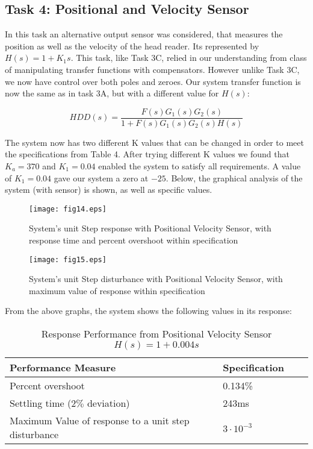 \documentclass{article}
\newcommand{\matlab}[1]{%
%
}
\begin{document}
\subsection*{Task 4: Positional and Velocity Sensor}

In this task an alternative output sensor was considered, that measures the
position as well as the velocity of the head reader. Its represented by $H(s)
= 1 + K_1s$. This task, like Task 3C, relied in our understanding from class of
manipulating transfer functions with compensators. However unlike Task 3C, we
now have control over both poles and zeroes. Our system transfer function is
now the same as in task 3A, but with a different value for $H(s)$:

$$HDD(s) = \frac{F(s)G_1(s)G_2(s)}{1 + F(s)G_1(s)G_2(s)H(s)}$$

The system now has two different K values that can be changed in order to meet
the specifications from Table 4. After trying different K values we found that
$K_a = 370$ and $K_1 = 0.04$ enabled the system to satisfy all requirements.
A value of $K_1 = 0.04$ gave our system a zero at $-25$. Below, the graphical
analysis of the system (with sensor) is shown, as well as specific values.


\matlab{fig14.m}

\begin{figure}[H]
  \caption{System's unit Step response with Positional Velocity Sensor, with response
  time and percent overshoot within specification} 
  \centering
  \texttt{[image: fig14.eps]}
\end{figure}

\matlab{fig15.m}

\begin{figure}[H]
  \caption{System's unit Step disturbance with Positional Velocity Sensor, with
  maximum value of response within specification}
  \centering
  \texttt{[image: fig15.eps]}
\end{figure}


From the above graphs, the system shows the following values in its response:

\begin{table}[H]
\begin{center}
  \begin{tabular}{ | l | l | l | p{5cm} |}
  \hline
  \textbf{Performance Measure} & \textbf{Specification}\\ \hline
  Percent overshoot & 0.134\% \\ \hline
  Settling time ($2\%$ deviation) & 243ms \\ \hline
  Maximum Value of response to a unit step disturbance & $3\cdot10^{-3}$\\ \hline 
 \end{tabular}
\end{center}
\caption{Response Performance from Positional Velocity Sensor $H(s) = 1 +
0.004 s$}
\end{table}
\end{document}
